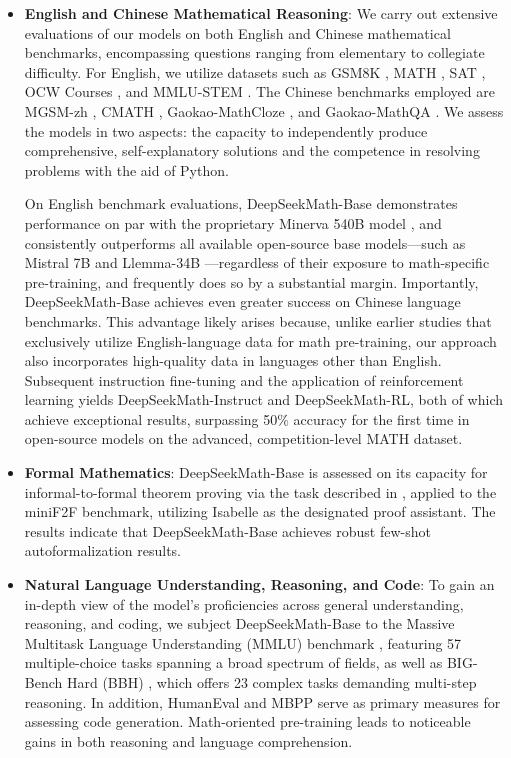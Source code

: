 \begin{itemize}[topsep=0pt]
    \item \textbf{English and Chinese Mathematical Reasoning}: We carry out extensive evaluations of our models on both English and Chinese mathematical benchmarks, encompassing questions ranging from elementary to collegiate difficulty. For English, we utilize datasets such as GSM8K \citep{gsm8k}, MATH \citep{MATH}, SAT \citep{llemma}, OCW Courses \citep{minerva}, and MMLU-STEM \citep{mmlu}. The Chinese benchmarks employed are MGSM-zh \citep{mgsm}, CMATH \citep{wei2023cmath}, Gaokao-MathCloze \citep{agieval}, and Gaokao-MathQA \citep{agieval}. We assess the models in two aspects: the capacity to independently produce comprehensive, self-explanatory solutions and the competence in resolving problems with the aid of Python.

On English benchmark evaluations, DeepSeekMath-Base demonstrates performance on par with the proprietary Minerva 540B model \citep{minerva}, and consistently outperforms all available open-source base models—such as Mistral 7B \citep{mistral} and Llemma-34B \citep{llemma}—regardless of their exposure to math-specific pre-training, and frequently does so by a substantial margin. Importantly, DeepSeekMath-Base achieves even greater success on Chinese language benchmarks. This advantage likely arises because, unlike earlier studies \citep{minerva, llemma} that exclusively utilize English-language data for math pre-training, our approach also incorporates high-quality data in languages other than English. Subsequent instruction fine-tuning and the application of reinforcement learning yields DeepSeekMath-Instruct and DeepSeekMath-RL, both of which achieve exceptional results, surpassing 50\% accuracy for the first time in open-source models on the advanced, competition-level MATH dataset.

\item \textbf{Formal Mathematics}: DeepSeekMath-Base is assessed on its capacity for informal-to-formal theorem proving via the task described in \citep{dsp_proof}, applied to the miniF2F \citep{minif2f} benchmark, utilizing Isabelle \citep{isabelle} as the designated proof assistant. The results indicate that DeepSeekMath-Base achieves robust few-shot autoformalization results.
\item \textbf{Natural Language Understanding, Reasoning, and Code}: To gain an in-depth view of the model's proficiencies across general understanding, reasoning, and coding, we subject DeepSeekMath-Base to the Massive Multitask Language Understanding (MMLU) benchmark \citep{mmlu}, featuring 57 multiple-choice tasks spanning a broad spectrum of fields, as well as BIG-Bench Hard (BBH) \citep{bbh}, which offers 23 complex tasks demanding multi-step reasoning. In addition, HumanEval \citep{codex} and MBPP \citep{mbpp} serve as primary measures for assessing code generation. Math-oriented pre-training leads to noticeable gains in both reasoning and language comprehension.


\end{itemize}
